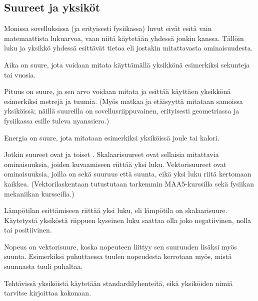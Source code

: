 \subsection*{Suureet ja yksiköt}

Monissa sovelluksissa (ja erityisesti fysiikassa) luvut eivät esitä vain matemaattista lukuarvoa, vaan niitä käytetään yhdessä jonkin  kanssa. Tällöin luku ja yksikkö yhdessä esittävät tietoa  eli jostakin mitattavasta ominaisuudesta.

\begin{esimerkki}

Aika on suure, jota voidaan mitata käyttämällä yksikkönä esimerkiksi sekunteja tai vuosia.

Pituus on suure, ja sen arvo voidaan mitata ja esittää käyttäen yksikkönä esimerkiksi metrejä ja tuumia. (Myös matkaa ja etäisyyttä mitataan samoissa yksiköissä; näillä suureilla on sovellusriippuvainen, erityisesti geometriassa ja fysiikassa esille tuleva nyanssiero.)

Energia on suure, jota mitataan esimerkiksi yksiköissä joule tai kalori.
\end{esimerkki}

Jotkin suureet ovat  ja toiset . Skalaarisuureet ovat sellaisia mitattavia ominaisuuksia, joiden kuvaamiseen riittää yksi luku. Vektorisuureet ovat ominaisuuksia, joilla on sekä suuruus että suunta, eikä yksi luku riitä kertomaan kaikkea. (Vektorilaskentaan tutustutaan tarkemmin MAA5-kurssilla sekä fysiikan mekaniikan kursseilla.)

\begin{esimerkki}

Lämpötilan esittämiseen riittää yksi luku, eli lämpötila on skalaarisuure. Käytetystä yksiköstä riippuen kyseinen luku saattaa olla joko negatiivinen, nolla tai positiivinen.

Nopeus on vektorisuure, koska nopeuteen liittyy sen suuruuden lisäksi myös suunta. Esimerkiksi puhuttaessa tuulen nopeudesta kerrotaan myös, mistä suunnasta tuuli puhaltaa.


\end{esimerkki}


Tehtävissä yksiköistä käytetään standardilyhenteitä, eikä yksiköiden nimiä tarvitse kirjoittaa kokonaan.

